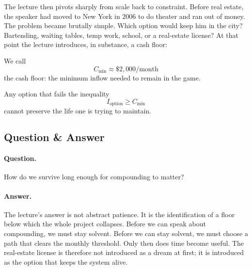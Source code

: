 The lecture then pivots sharply from scale back to constraint. Before real estate, the speaker had moved to New York in 2006 to do theater and ran out of money. The problem became brutally simple. Which option would keep him in the city? Bartending, waiting tables, temp work, school, or a real-estate license? At that point the lecture introduces, in substance, a cash floor:
\begin{definition}
We call
\begin{equation}
C_{\min} \approx \$2{,}000/\text{month}
\end{equation}
the cash floor: the minimum inflow needed to remain in the game.
\end{definition}
Any option that fails the inequality
\begin{equation}
I_{\text{option}} \ge C_{\min}
\end{equation}
cannot preserve the life one is trying to maintain.

\subsection{Question \& Answer}

\paragraph{Question.} How do we survive long enough for compounding to matter?

\paragraph{Answer.} The lecture's answer is not abstract patience. It is the identification of a floor below which the whole project collapses. Before we can speak about compounding, we must stay solvent. Before we can stay solvent, we must choose a path that clears the monthly threshold. Only then does time become useful. The real-estate license is therefore not introduced as a dream at first; it is introduced as the option that keeps the system alive.

\begin{figure}
\centering
{}
\end{figure}

